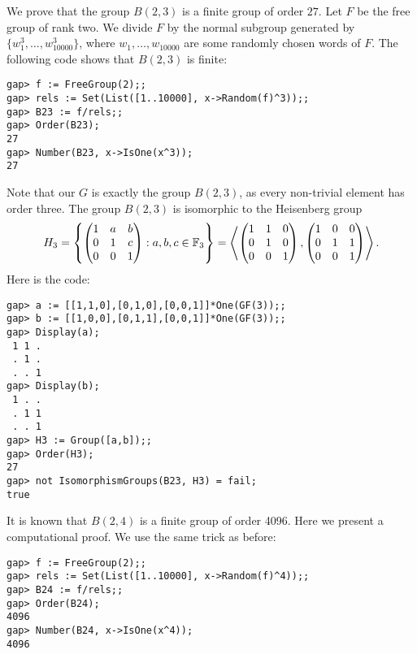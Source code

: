 \begin{example}
	We prove that the group $B(2,3)$ is a finite group of order $27$.
	Let $F$ be the free group of rank two. We divide $F$ by the
	normal subgroup generated by $\{w_1^3,\dots,w_{10000}^3\}$, where 
	$w_1,\dots,w_{10000}$ are some randomly chosen words of $F$.
	The following
	code shows that $B(2,3)$ is finite:
\begin{lstlisting}
gap> f := FreeGroup(2);;
gap> rels := Set(List([1..10000], x->Random(f)^3));;
gap> B23 := f/rels;;
gap> Order(B23);
27
gap> Number(B23, x->IsOne(x^3));
27
\end{lstlisting}
Note that our $G$ is exactly the group $B(2,3)$, as every non-trivial
element has order three. The group $B(2,3)$ is isomorphic
to the Heisenberg group
\[
H_3=\left\{\begin{pmatrix}
    1 & a & b\\
    0 & 1 & c\\
    0 & 0 & 1
    \end{pmatrix}:a,b,c\in\mathbb{F}_3\right\}
    =\left\langle 
    \begin{pmatrix}
    1 & 1 & 0\\
    0 & 1 & 0\\
    0 & 0 & 1
    \end{pmatrix},
    \begin{pmatrix}
    1 & 0 & 0\\
    0 & 1 & 1\\
    0 & 0 & 1
    \end{pmatrix}
    \right\rangle.
\]
Here is the code:
\begin{lstlisting}
gap> a := [[1,1,0],[0,1,0],[0,0,1]]*One(GF(3));;
gap> b := [[1,0,0],[0,1,1],[0,0,1]]*One(GF(3));;
gap> Display(a);
 1 1 .
 . 1 .
 . . 1
gap> Display(b);
 1 . .
 . 1 1
 . . 1
gap> H3 := Group([a,b]);;
gap> Order(H3);
27
gap> not IsomorphismGroups(B23, H3) = fail;
true
\end{lstlisting}
\end{example}

\begin{example}
	It is known that $B(2,4)$ is a finite group of order 4096. 
	Here we present a
	computational proof.  We use the same trick as before:
\begin{lstlisting}
gap> f := FreeGroup(2);;
gap> rels := Set(List([1..10000], x->Random(f)^4));;
gap> B24 := f/rels;;
gap> Order(B24);
4096
gap> Number(B24, x->IsOne(x^4));
4096
\end{lstlisting}
\end{example}

